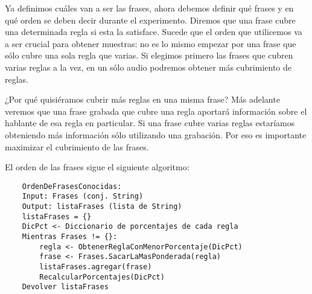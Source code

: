 Ya definimos cuáles van a ser las frases, ahora debemos definir qué frases y en qué orden se deben decir durante el experimento. Diremos que una frase cubre una determinada regla si esta la satisface. Sucede que el orden que utilicemos va a ser crucial para obtener muestras: no es lo mismo empezar por una frase que sólo cubre una sola regla que varias. Si elegimos primero las frases que cubren varias reglas a la vez, en un sólo audio podremos obtener más cubrimiento de reglas. 

¿Por qué quisiéramos cubrir más reglas en una misma frase? Más adelante veremos que una frase grabada que cubre una regla aportará información sobre el hablante de esa regla en particular. Si una frase cubre varias reglas estaríamos obteniendo más información sólo utilizando una grabación. Por eso es importante maximizar el cubrimiento de las frases.  

El orden de las frases sigue el siguiente algoritmo:

\begin{lstlisting}
    OrdenDeFrasesConocidas:
    Input: Frases (conj. String)
    Output: listaFrases (lista de String)
    listaFrases = {}
    DicPct <- Diccionario de porcentajes de cada regla
    Mientras Frases != {}:
    	regla <- ObtenerReglaConMenorPorcentaje(DicPct)
    	frase <- Frases.SacarLaMasPonderada(regla)
    	listaFrases.agregar(frase)
    	RecalcularPorcentajes(DicPct)
    Devolver listaFrases
\end{lstlisting}

